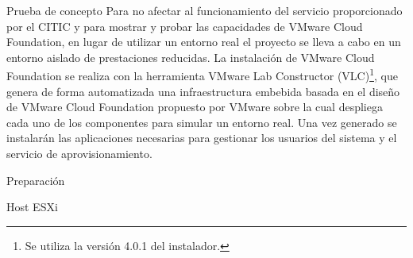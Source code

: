 \begin{section}{Prueba de concepto}
Para no afectar al funcionamiento del servicio proporcionado por el CITIC y para mostrar y probar las capacidades de VMware Cloud Foundation, en lugar de utilizar un entorno real el proyecto se lleva a cabo en un entorno aislado de prestaciones reducidas. La instalación de VMware Cloud Foundation se realiza con la herramienta VMware Lab Constructor (VLC)\footnote{Se utiliza la versión 4.0.1 del instalador.}, que genera de forma automatizada una infraestructura embebida basada en el diseño de VMware Cloud Foundation propuesto por VMware sobre la cual despliega cada uno de los componentes para simular un entorno real. Una vez generado se instalarán las aplicaciones necesarias para gestionar los usuarios del sistema y el servicio de aprovisionamiento.

\begin{subsection}{Preparación}
  \begin{subsubsection}{Host ESXi}  
  

\end{subsubsection}
\end{subsection}
\end{section}
